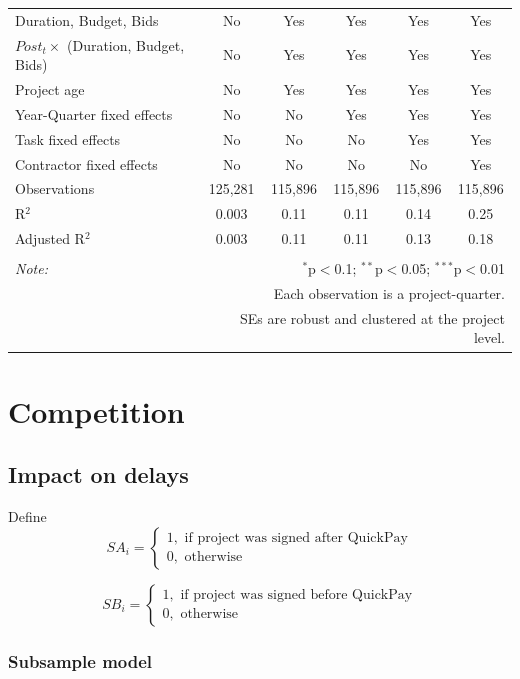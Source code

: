 \documentclass[
]{article}
\begin{document}
\begin{table}[H]
\begin{tabular}{@{\extracolsep{-2pt}}lccccc}
Duration, Budget, Bids & No & Yes & Yes & Yes & Yes \\ 
$Post_t \times $  (Duration, Budget, Bids) & No & Yes & Yes & Yes & Yes \\ 
Project age & No & Yes & Yes & Yes & Yes \\ 
Year-Quarter fixed effects & No & No & Yes & Yes & Yes \\ 
Task fixed effects & No & No & No & Yes & Yes \\ 
Contractor fixed effects & No & No & No & No & Yes \\ 
Observations & 125,281 & 115,896 & 115,896 & 115,896 & 115,896 \\ 
R$^{2}$ & 0.003 & 0.11 & 0.11 & 0.14 & 0.25 \\ 
Adjusted R$^{2}$ & 0.003 & 0.11 & 0.11 & 0.13 & 0.18 \\ 
\hline 
\hline \\[-1.8ex] 
\textit{Note:}  & \multicolumn{5}{r}{$^{*}$p$<$0.1; $^{**}$p$<$0.05; $^{***}$p$<$0.01} \\ 
 & \multicolumn{5}{r}{Each observation is a project-quarter.} \\ 
 & \multicolumn{5}{r}{SEs are robust and clustered at the project level.} \\ 
\end{tabular} 
\end{table}

\hypertarget{competition}{%
\section{Competition}\label{competition}}

\hypertarget{impact-on-delays}{%
\subsection{Impact on delays}\label{impact-on-delays}}

Define
\[ SA_i = \begin{cases} 1, \text{ if project was signed after QuickPay}\\
0, \text{ otherwise} \end{cases}\]

\[ SB_i = \begin{cases} 1, \text{ if project was signed before QuickPay}\\
0, \text{ otherwise} \end{cases}\]

\hypertarget{subsample-model}{%
\subsubsection{Subsample model}\label{subsample-model}}
\end{document}
